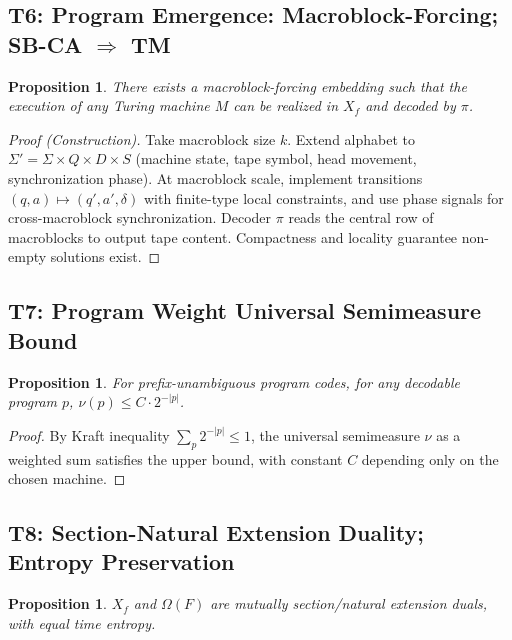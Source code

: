 \documentclass[11pt]{article}
\newtheorem{proposition}[theorem]{Proposition}
\theoremstyle{definition}
\theoremstyle{remark}
\begin{document}
\subsection{T6: Program Emergence: Macroblock-Forcing; SB-CA \(\Rightarrow\) TM}

\begin{proposition}\label{thm:T6}
There exists a macroblock-forcing embedding such that the execution of any Turing machine \( M \) can be realized in \( X_f \) and decoded by \( \pi \).
\end{proposition}

\begin{proof}[Proof (Construction)]
Take macroblock size \( k \). Extend alphabet to \( \Sigma' = \Sigma \times Q \times D \times S \) (machine state, tape symbol, head movement, synchronization phase). At macroblock scale, implement transitions \( (q, a) \mapsto (q', a', \delta) \) with finite-type local constraints, and use phase signals for cross-macroblock synchronization. Decoder \( \pi \) reads the central row of macroblocks to output tape content. Compactness and locality guarantee non-empty solutions exist.
\end{proof}

\subsection{T7: Program Weight Universal Semimeasure Bound}

\begin{proposition}\label{thm:T7}
For prefix-unambiguous program codes, for any decodable program \( p \), \( \nu(p) \leq C \cdot 2^{-|p|} \).
\end{proposition}

\begin{proof}
By Kraft inequality \( \sum_p 2^{-|p|} \leq 1 \), the universal semimeasure \( \nu \) as a weighted sum satisfies the upper bound, with constant \( C \) depending only on the chosen machine.
\end{proof}

\subsection{T8: Section-Natural Extension Duality; Entropy Preservation}

\begin{proposition}\label{thm:T8}
\( X_f \) and \( \Omega(F) \) are mutually section/natural extension duals, with equal time entropy.
\end{proposition}
\end{document}
